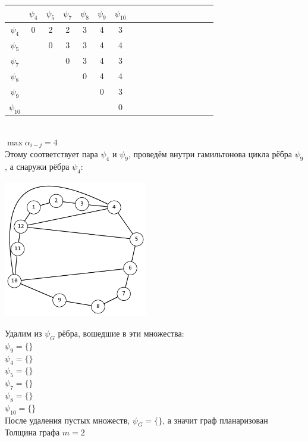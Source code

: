 \documentclass[12pt,a4paper]{report}
\begin{document}
\begin{tabular}{|c|c|c|c|c|c|c|c|c|c|c|c|c|c|c|c|c|}
    \hline
    & $\psi_{4}$ & $\psi_{5}$ & $\psi_{7}$ & $\psi_{8}$ & $\psi_{9}$ & $\psi_{10}$ \\
    \hline
    $\psi_{4}$  & 0 & 2  & 2 & 3  & 4  & 3  \\
    \hline
    $\psi_{5}$  &   & 0  & 3 & 3  & 4  & 4  \\
    \hline
    $\psi_{7}$  &   &    & 0 & 3  & 4  & 3  \\
    \hline
    $\psi_{8}$  &   &    &   & 0  & 4  & 4  \\
    \hline
    $\psi_{9}$  &   &    &   &    & 0  & 3  \\
    \hline
    $\psi_{10}$ &   &    &   &    &    & 0  \\
    \hline
\end{tabular}\\
\hfill\break
$\max \alpha_{i-j}=4$\\
Этому соответствует пара $\psi_4$ и $\psi_9$, проведём внутри гамильтонова цикла рёбра $\psi_9$, а снаружи рёбра $\psi_4$:\\
\begin{center}
    \includegraphics[height=6cm]{graph_2.png}
\end{center}
Удалим из $\psi_G$ рёбра, вошедшие в эти множества:\\
$\psi_{9} = \{\}$ \\
$\psi_{4} = \{\}$ \\
$\psi_{5} = \{\}$ \\
$\psi_{7} = \{\}$ \\
$\psi_{8} = \{\}$ \\
$\psi_{10} = \{\}$ \\
После удаления пустых множеств, $\psi_G=\{\}$, а значит граф планаризован\\
Толщина графа $m=2$
\end{document}
